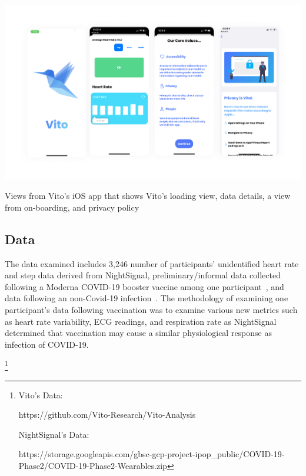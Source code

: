 \documentclass{article}
\newcommand\todo[1]{\textcolor{blue}{#1}}
\begin{document}
\includegraphics[scale=0.08]{VitoApps.png} 

\caption{
Views from Vito's iOS app that shows Vito's loading view, data details, a view from on-boarding, and privacy policy}

\subsection{Data}
The data examined includes 3,246 number of participants' unidentified heart rate and step data derived from NightSignal, preliminary/informal data collected following a Moderna COVID-19 booster vaccine among one participant~\cite{VaccineData}, and data following an non-Covid-19 infection~\cite{VitoAnalysis}.  The methodology of examining one participant's data following vaccination was to examine various new metrics such as heart rate variability, ECG readings, and respiration rate as NightSignal determined that vaccination may cause a similar physiological response as infection of COVID-19.


 \footnote{

Vito's Data: 

https://github.com/Vito-Research/Vito-Analysis

NightSignal's Data:  

https://storage.googleapis.com/gbsc-gcp-project-ipop_public/COVID-19-Phase2/COVID-19-Phase2-Wearables.zip
}
\end{document}
